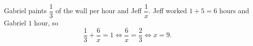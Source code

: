 Gabriel paints $\dfrac13$ of the wall per hour and Jeff $\dfrac1x$. Jeff worked $1+5=6$ hours and Gabriel $1$ hour, so
\[\dfrac13+\dfrac6x=1\iff\dfrac6x=\dfrac23\iff x=\boxed{9}.\]
